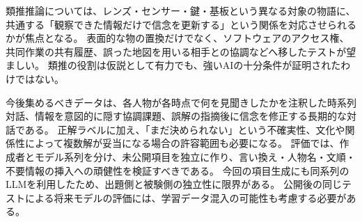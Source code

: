 類推推論については、レンズ・センサー・鍵・基板という異なる対象の物語に、共通する「観察できた情報だけで信念を更新する」という関係を対応させられるかが焦点となる。
表面的な物の置換だけでなく、ソフトウェアのアクセス権、共同作業の共有履歴、誤った地図を用いる相手との協調などへ移したテストが望ましい。
類推の役割は仮説として有力でも、強いAIの十分条件が証明されたわけではない。

今後集めるべきデータは、各人物が各時点で何を見聞きしたかを注釈した時系列対話、情報を意図的に隠す協調課題、誤解の指摘後に信念を修正する長期的な対話である。
正解ラベルに加え、「まだ決められない」という不確実性、文化や関係性によって複数解が妥当になる場合の許容範囲も必要になる。
評価では、作成者とモデル系列を分け、未公開項目を独立に作り、言い換え・人物名・文順・不要情報の挿入への頑健性を検証すべきである。
今回の項目生成にも同系列のLLMを利用したため、出題側と被験側の独立性に限界がある。
公開後の同じテストによる将来モデルの評価には、学習データ混入の可能性も考慮する必要がある\cite{tomreview}。
